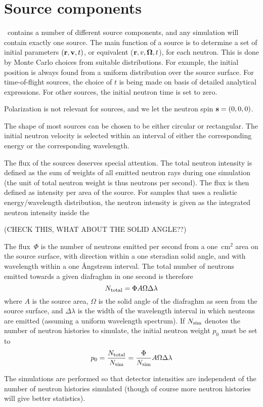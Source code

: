 
\chapter{Source components}
\label{c:source}

\MCS\ contains a number of different source components, 
and any simulation will contain exactly one source.
The main function of a source is to determine a set of initial
parameters $({\bf r}, {\bf v}, t)$, or equivalent (${\bf r}, v, \mbox{\boldmath $\Omega$} , t $),
for each neutron. This is done by Monte Carlo choices from
suitable distributions. For example, the initial position is
always found from a uniform distribution over the source surface.
For time-of-flight sources, the choice of $t$ is being made on basis of
detailed analytical expressions.
For other sources, the initial neutron time is set to zero.

Polarization is not relevant for sources, 
and we let the neutron spin ${\bf s}=(0,0,0)$.

The shape of most sources can be chosen to be either circular or rectangular.
The initial neutron velocity is selected within an interval
of either the corresponding energy or the corresponding wavelength.

The flux of the sources deserves special attention. The total neutron
intensity is defined as the sum of weights of all emitted neutron rays 
during one simulation 
(the unit of total neutron weight is thus neutrons per second).
The flux is then defined as intensity per area of the source.
For samples that uses a realistic energy/wavelength distribution,
the neutron intensity is given as the integrated neutron intensity
inside the  

(CHECK THIS, WHAT ABOUT THE SOLID ANGLE??)

The flux~$\Phi$ is the number of neutrons emitted per second from a
one~cm$^2$ area on the source surface, with direction within a one
steradian solid angle, and with wavelength within a one {\AA}ngstr{\o}m
interval. The total number of neutrons emitted towards a given diafraghm
in one second is therefore
$$ N_{\rm total} = \Phi A \Omega \Delta\lambda $$
where $A$ is the source area, $\Omega$ is the solid angle of the
diafraghm as seen from the source surface, and $\Delta\lambda$ is the
width of the wavelength interval in which neutrons are emitted (assuming
a uniform wavelength spectrum). If $N_{\rm sim}$ denotes the number of
neutron histories to simulate, the initial neutron weight $p_0$ must be set to
$$ p_0 = \frac{N_{\rm total}}{N_{\rm sim}} = 
    \frac{\Phi}{N_{\rm sim}} A \Omega \Delta\lambda $$

The simulations are performed so that detector intensities 
are independent of the number of neutron histories simulated
(though of course more neutron histories will give better statistics).

\newpage


%

\newpage


%

%

%
